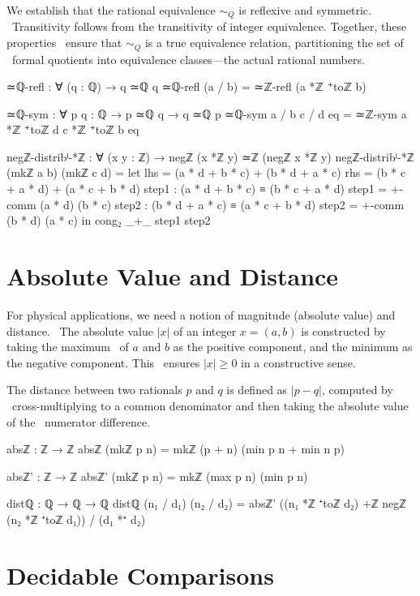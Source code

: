 \documentclass[11pt,a4paper]{book}
\def\mathbb#1{#1}%
\begin{document}
We establish that the rational equivalence $\sim_{\mathbb{Q}}$ is reflexive and symmetric. \
Transitivity follows from the transitivity of integer equivalence. Together, these properties \
ensure that $\sim_{\mathbb{Q}}$ is a true equivalence relation, partitioning the set of \
formal quotients into equivalence classes---the actual rational numbers.

\begin{code}
≃ℚ-refl : ∀ (q : ℚ) → q ≃ℚ q
≃ℚ-refl (a / b) = ≃ℤ-refl (a *ℤ ⁺toℤ b)

≃ℚ-sym : ∀ {p q : ℚ} → p ≃ℚ q → q ≃ℚ p
≃ℚ-sym {a / b} {c / d} eq = ≃ℤ-sym {a *ℤ ⁺toℤ d} {c *ℤ ⁺toℤ b} eq

negℤ-distribˡ-*ℤ : ∀ (x y : ℤ) → negℤ (x *ℤ y) ≃ℤ (negℤ x *ℤ y)
negℤ-distribˡ-*ℤ (mkℤ a b) (mkℤ c d) = 
  let lhs = (a * d + b * c) + (b * d + a * c)
      rhs = (b * c + a * d) + (a * c + b * d)
      step1 : (a * d + b * c) ≡ (b * c + a * d)
      step1 = +-comm (a * d) (b * c)
      step2 : (b * d + a * c) ≡ (a * c + b * d)
      step2 = +-comm (b * d) (a * c)
  in cong₂ _+_ step1 step2
\end{code}

\section{Absolute Value and Distance}

For physical applications, we need a notion of magnitude (absolute value) and distance. \
The absolute value $|x|$ of an integer $x = (a,b)$ is constructed by taking the maximum \
of $a$ and $b$ as the positive component, and the minimum as the negative component. This \
ensures $|x| \ge 0$ in a constructive sense.

The distance between two rationals $p$ and $q$ is defined as $|p - q|$, computed by \
cross-multiplying to a common denominator and then taking the absolute value of the \
numerator difference.

\begin{code}
absℤ : ℤ → ℤ
absℤ (mkℤ p n) = mkℤ (p + n) (min p n + min n p)

absℤ' : ℤ → ℤ
absℤ' (mkℤ p n) = mkℤ (max p n) (min p n)

distℚ : ℚ → ℚ → ℚ
distℚ (n₁ / d₁) (n₂ / d₂) = absℤ' ((n₁ *ℤ ⁺toℤ d₂) +ℤ negℤ (n₂ *ℤ ⁺toℤ d₁)) / (d₁ *⁺ d₂)
\end{code}

\section{Decidable Comparisons}
\end{document}
